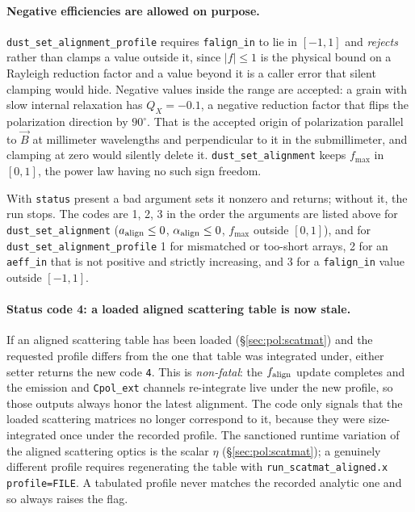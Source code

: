\documentclass{my_memo}
\newcommand{\code}[1]{\texttt{#1}}
\begin{document}
\paragraph{Negative efficiencies are allowed on purpose.}
\code{dust\_set\_alignment\_profile} requires \code{falign\_in} to lie in
$[-1, 1]$ and \emph{rejects} rather than clamps a value outside it, since
$|f| \le 1$ is the physical bound on a Rayleigh reduction factor and a value
beyond it is a caller error that silent clamping would hide. Negative values
inside the range are accepted: a grain with slow internal relaxation has
$Q_X = -0.1$, a negative reduction factor that flips the polarization
direction by $90^\circ$. That is the accepted origin of polarization parallel
to $\vec{B}$ at millimeter wavelengths and perpendicular to it in the
submillimeter, and clamping at zero would silently delete it.
\code{dust\_set\_alignment} keeps $f_{\max}$ in $[0, 1]$, the power law having
no such sign freedom.

With \code{status} present a bad argument sets it nonzero and returns; without
it, the run stops. The codes are 1, 2, 3 in the order the arguments are listed
above for \code{dust\_set\_alignment} ($a_{\rm align} \le 0$,
$\alpha_{\rm align} \le 0$, $f_{\max}$ outside $[0,1]$), and for
\code{dust\_set\_alignment\_profile} 1 for mismatched or too-short arrays,
2 for an \code{aeff\_in} that is not positive and strictly increasing, and
3 for a \code{falign\_in} value outside $[-1, 1]$.

\paragraph{Status code 4: a loaded aligned scattering table is now stale.}
If an aligned scattering table has been loaded (\S\ref{sec:pol:scatmat}) and the
requested profile differs from the one that table was integrated under, either
setter returns the new code \code{4}. This is \emph{non-fatal}: the
$f_{\rm align}$ update completes and the emission and \code{Cpol\_ext} channels
re-integrate live under the new profile, so those outputs always honor the latest
alignment. The code only signals that the loaded scattering matrices no longer
correspond to it, because they were size-integrated once under the recorded
profile. The sanctioned runtime variation of the aligned scattering optics is the
scalar $\eta$ (\S\ref{sec:pol:scatmat}); a genuinely different profile requires
regenerating the table with \code{run\_scatmat\_aligned.x profile=FILE}. A
tabulated profile never matches the recorded analytic one and so always raises
the flag.
\end{document}
